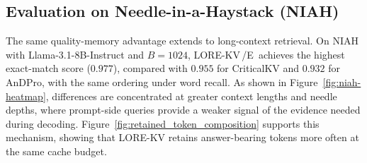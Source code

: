 \documentclass{article} %
\newcommand{\lorekvE}{LORE-KV\,/E}
\begin{document}
\subsection{Evaluation on Needle-in-a-Haystack (NIAH)}\label{subsec:niah}
The same quality-memory advantage extends to long-context retrieval. On NIAH with Llama-3.1-8B-Instruct and $B=1024$, \lorekvE\ achieves the highest exact-match score ($0.977$), compared with $0.955$ for CriticalKV and $0.932$ for AnDPro, with the same ordering under word recall. As shown in Figure~\ref{fig:niah-heatmap}, differences are concentrated at greater context lengths and needle depths, where prompt-side queries provide a weaker signal of the evidence needed during decoding. Figure~\ref{fig:retained_token_composition} supports this mechanism, showing that LORE-KV retains answer-bearing tokens more often at the same cache budget.
\end{document}
